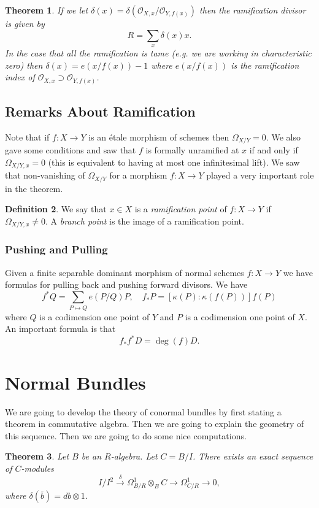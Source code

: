 \documentclass[12pt]{article}
\numberwithin{equation}{section}
\newtheorem{theorem}{Theorem}[subsection]
\theoremstyle{definition}
\newtheorem{definition}[theorem]{Definition}
\theoremstyle{remark}
\newcommand{\Ocal}{\mathcal{O}}
\begin{document}
\begin{theorem}
	If we let $\delta(x) = \delta(\Ocal_{X,x}/\Ocal_{Y,f(x)})$ then the ramification divisor is given by 
	 $$ R = \sum_{x} \delta(x) x. $$
	In the case that all the ramification is tame (e.g. we are working in characteristic zero) then $\delta(x) = e(x/f(x))-1$ where $e(x/f(x))$ is the ramification index of $\Ocal_{X,x}\supset  \Ocal_{Y,f(x)}$. 
\end{theorem}

\subsection{Remarks About Ramification}
Note that if $f:X\to Y$ is an \'etale morphism of schemes then $\Omega_{X/Y}=0$. 
We also gave some conditions and saw that $f$ is formally unramified at $x$ if and only if $\Omega_{X/Y,x}=0$ (this is equivalent to having at most one infinitesimal lift).
We saw that non-vanishing of $\Omega_{X/Y}$ for a morphism $f:X\to Y$ played a very important role in the theorem.
\begin{definition}
	We say that $x\in X$ is a \emph{ramification point} of $f:X\to Y$ if $\Omega_{X/Y,x}\neq 0$. 
	A \emph{branch point} is the image of a ramification point.
\end{definition}

\subsubsection{Pushing and Pulling}
Given a finite separable dominant morphism of normal schemes $f:X\to Y$ we have formulas for pulling back and pushing forward divisors. 
We have 
$$ f^*Q = \sum_{P\mapsto Q }e(P/Q)P, \quad f_*P = [\kappa(P):\kappa(f(P))] f(P) $$
where $Q$ is a codimension one point of $Y$ and $P$ is a codimension one point of $X$.  An important formula is that 
 $$ f_*f^*D = \deg(f) D.$$
 


 
\section{Normal Bundles}
We are going to develop the theory of conormal bundles by first stating a theorem in commutative algebra. 
Then we are going to explain the geometry of this sequence. 
Then we are going to do some nice computations. 

\begin{theorem}
	Let $B$ be an $R$-algebra. 
	Let $C=B/I$. 
	There exists an exact sequence of $C$-modules
	 $$ I/I^2 \xrightarrow{\delta} \Omega_{B/R}^1\otimes_B C \to \Omega^1_{C/R} \to 0,$$
	 where $\delta(\overline{b}) = db\otimes 1$. 
\end{theorem}
\end{document}
